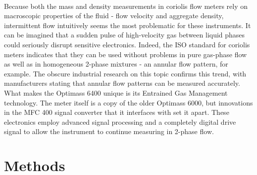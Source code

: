 \documentclass{report}
\begin{document}
\\
Because both the mass and density measurements in coriolis flow meters rely on macroscopic properties of the fluid - flow velocity and aggregate density, intermittent flow intuitively seems the most problematic for these instruments. It can be imagined that a sudden pulse of high-velocity gas between liquid phases could seriously disrupt sensitive electronics. Indeed, the ISO standard for coriolis meters indicates that they can be used without problems in pure gas-phase flow as well as in homogeneous 2-phase mixtures - an annular flow pattern, for example. \cite{ISO} The obscure industrial research on this topic confirms this trend, with manufacturers stating that annular flow patterns can be measured accurately. \cite{emerson2Phase}\\
What makes the Optimass 6400 unique is its Entrained Gas Management technology. The meter itself is a copy of the older Optimass 6000, but innovations in the MFC 400 signal converter that it interfaces with set it apart. These electronics employ advanced signal processing and a completely digital drive signal to allow the instrument to continue measuring in 2-phase flow. \cite{krohne brochure}\cite{processArticle}\\

\chapter{Methods} 
\label{methods}
\end{document}
